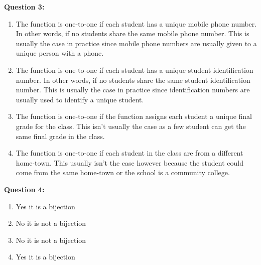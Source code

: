 \documentclass[11pt]{article}
\begin{document}
\begin{enumerate}
\textbf{Question 3:}

\begin{enumerate}[label=(\alph*)]
\item
The function is one-to-one if each student has a unique mobile phone number. In other words, if no students share the same mobile phone number. This is usually the case in practice since mobile phone numbers are usually given to a unique person with a phone.

\item
The function is one-to-one if each student has a unique student identification number. In other words, if no students share the same student identification number. This is usually the case in practice since identification numbers are usually used to identify a unique student. 

\item
The function is one-to-one if the function assigns each student a unique final grade for the class. This isn't usually the case as a few student can get the same final grade in the class.

\item
The function is one-to-one if each student in the class are from a different home-town. This usually isn't the case however because the student could come from the same home-town or the school is a community college.


\end{enumerate}

\textbf{Question 4:}

\begin{enumerate}[label=(\alph*)]
\item
Yes it is a bijection 

\item
No it is not a bijection

\item
No it is not a bijection

\item
Yes it is a bijection

\end{enumerate}

\end{enumerate}
\end{document}
